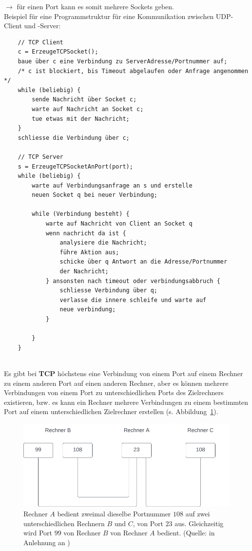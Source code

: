 \noindent
$\rightarrow$ für einen Port kann es somit mehrere Sockets geben.\\

Beispiel für eine Programmstruktur für eine Kommunikation zwischen UDP-Client und -Server:
\begin{verbatim}
    // TCP Client
    c = ErzeugeTCPSocket();
    baue über c eine Verbindung zu ServerAdresse/Portnummer auf;
    /* c ist blockiert, bis Timeout abgelaufen oder Anfrage angenommen */
    while (beliebig) {
        sende Nachricht über Socket c;
        warte auf Nachricht an Socket c;
        tue etwas mit der Nachricht;
    }
    schliesse die Verbindung über c;

    // TCP Server
    s = ErzeugeTCPSocketAnPort(port);
    while (beliebig) {
        warte auf Verbindungsanfrage an s und erstelle
        neuen Socket q bei neuer Verbindung;

        while (Verbindung besteht) {
            warte auf Nachricht von Client an Socket q
            wenn nachricht da ist {
                analysiere die Nachricht;
                führe Aktion aus;
                schicke über q Antwort an die Adresse/Portnummer
                der Nachricht;
            } ansonsten nach timeout oder verbindungsabbruch {
                schliesse Verbindung über q;
                verlasse die innere schleife und warte auf
                neue verbindung;
            }

        }
    }
\end{verbatim}\\

\noindent
Es gibt bei \textbf{TCP} höchstens eine Verbindung von einem Port auf einem Rechner zu einem anderen Port auf einen anderen Rechner, aber es können mehrere Verbindungen von einem Port zu unterschiedlichen Ports des Zielrechners existieren, bzw. es kann ein Rechner mehrere Verbindungen zu einem bestimmten Port auf einem unterschiedlichen Zielrechner erstellen (s. Abbildung~\ref{fig:tcpconnections}).


\begin{figure}
    \centering
    \includegraphics[scale=0.5]{chapters/fopt5/img/sockets/tcpconnections}
    \caption[fontsize=\small]{Rechner $A$ bedient zweimal dieselbe Portnummer $108$ auf zwei unterschiedlichen Rechnern $B$ und $C$, von Port $23$ aus. Gleichzeitig wird Port $99$ von Rechner $B$ von Rechner $A$ bedient. (Quelle: in Anlehnung an \cite[265, Bild 5.3]{Oec22})}
    \label{fig:tcpconnections}
\end{figure}


